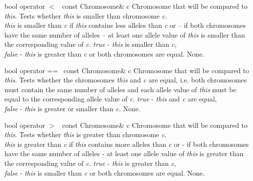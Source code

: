     \setConstInstance
    \printMethodWithOneParam
        {bool}  
        {operator $<$\ } 
        {const Chromosome\&}
        {c} 
        {Chromosome that will be compared to {\em this}.}
        {Tests whether {\em this} is smaller than chromosome {\em c}.\\
         {\em this} is smaller than {\em c} if {\em this} contains
         less alleles than {\em c} or -- if both chromosomes have the
         same number of alleles -- at least one allele value of {\em this}
         is smaller than the corresponding value of {\em c}.}
        {
         {\em true}\hspace{2pt} - {\em this} is smaller than {\em c},\\
         {\em false} - {\em this} is greater than {\em c} or both
         chromosomes are equal.}
        {None.}

\vspace*{4ex}

    \setConstInstance
    \printMethodWithOneParam
        {bool}  
        {operator ==\ } 
        {const Chromosome\&}
        {c} 
        {Chromosome that will be compared to {\em this}.}
        {Tests whether the chromosomes {\em this} and {\em c} are
         equal, i.e. both chromosomes must contain the same
         number of alleles and each allele value of {\em this} must
         be equal to the corresponding allele value of {\em c}.}
        {
         {\em true}\hspace{2pt} - {\em this} and {\em c} are equal,\\
         {\em false} - {\em this} is greater or smaller than {\em c}.}
        {None.}

\vspace*{4ex}

    \setConstInstance
    \printMethodWithOneParam
        {bool}  
        {operator $>$\ } 
        {const Chromosome\&}
        {c} 
        {Chromosome that will be compared to {\em this}.}
        {Tests whether {\em this} is greater than chromosome {\em c}.\\
         {\em this} is greater than {\em c} if {\em this} contains
         more alleles than {\em c} or - if both chromosomes have the
         same number of alleles - at least one allele value of {\em this}
         is greater than the corresponding value of {\em c}.}
        {
         {\em true}\hspace{2pt} - {\em this} is greater than {\em c},\\
         {\em false} - {\em this} is smaller than {\em c} or both chromosomes
         are equal.}
        {None.}

